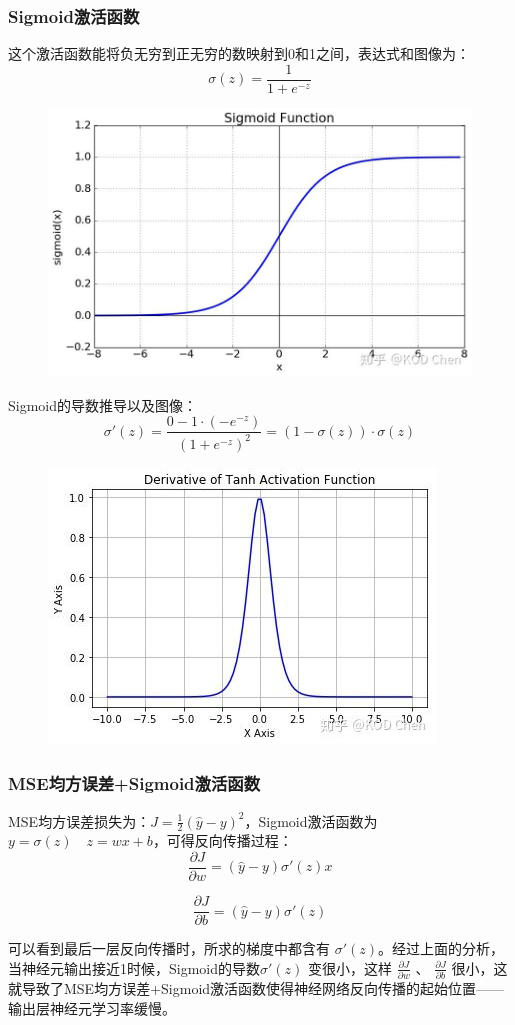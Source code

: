 \documentclass[12pt]{article}
\begin{document}
\subsubsection{Sigmoid激活函数}
这个激活函数能将负无穷到正无穷的数映射到0和1之间，表达式和图像为：
$$
\sigma(z) = \frac{1}{1 + e^{-z}}
$$
\begin{figure}[H]
  \centering
  \includegraphics[width=.5\textwidth]{fig/sigmoid_illustration.jpg} 
\end{figure}

Sigmoid的导数推导以及图像：
$$
\sigma'(z) = \frac{0 - 1\cdot(-e^{-z})}{(1+e^{-z})^2} = (1-\sigma(z))\cdot\sigma(z)
$$
\begin{figure}[H]
  \centering
  \includegraphics[width=.5\textwidth]{fig/sigmoid_derievative_illustration.jpg} 
\end{figure}

\subsubsection{MSE均方误差+Sigmoid激活函数}
MSE均方误差损失为：$J = \frac{1}{2}(\hat y - y)^2$，Sigmoid激活函数为 $y = \sigma(z) \quad z = wx + b$，可得反向传播过程：
$$
\frac{\partial J}{\partial w} = (\hat y - y)\sigma'(z)x
$$

$$
\frac{\partial J}{\partial b} = (\hat y - y)\sigma'(z)
$$

可以看到最后一层反向传播时，所求的梯度中都含有 $\sigma'(z)$。经过上面的分析，当神经元输出接近1时候，Sigmoid的导数$\sigma'(z)$ 变很小，这样 $\frac{\partial J}{\partial w}$ 、 $\frac{\partial J}{\partial b}$ 很小，这就导致了MSE均方误差+Sigmoid激活函数使得神经网络反向传播的起始位置——输出层神经元学习率缓慢。
\end{document}
